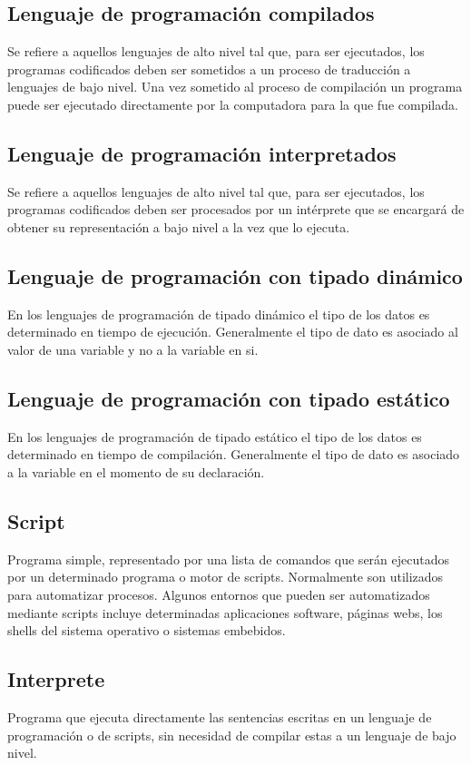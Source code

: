\subsection{Lenguaje de programación compilados}
Se refiere a aquellos lenguajes de alto nivel tal que, para ser ejecutados, los programas codificados deben ser sometidos a un proceso 
de traducción a lenguajes de bajo nivel. Una vez sometido al proceso de compilación un programa puede ser ejecutado directamente por 
la computadora para la que fue compilada.  

\subsection{Lenguaje de programación interpretados}
Se refiere a aquellos lenguajes de alto nivel tal que, para ser ejecutados, los programas codificados deben ser procesados por un intérprete que 
se encargará de obtener su representación a bajo nivel a la vez que lo ejecuta.

\subsection{Lenguaje de programación con tipado dinámico}
En los lenguajes de programación de tipado dinámico el tipo de los datos es determinado en tiempo de ejecución. Generalmente el tipo de dato es asociado 
al valor de una variable y no a la variable en si. 
 
\subsection{Lenguaje de programación con tipado estático}
En los lenguajes de programación de tipado estático el tipo de los datos es determinado en tiempo de compilación. Generalmente el tipo de dato es asociado 
a la variable en el momento de su declaración.  

\subsection{Script}
Programa simple, representado por una lista de comandos que serán ejecutados por un determinado programa o motor de scripts. Normalmente son utilizados
para automatizar procesos. Algunos entornos que pueden ser automatizados mediante scripts incluye 
determinadas aplicaciones software, páginas webs, los shells del sistema operativo o sistemas embebidos.

\subsection{Interprete}
Programa que ejecuta directamente las sentencias escritas en un lenguaje de programación o de scripts, sin necesidad de compilar estas a un lenguaje de 
bajo nivel. 

